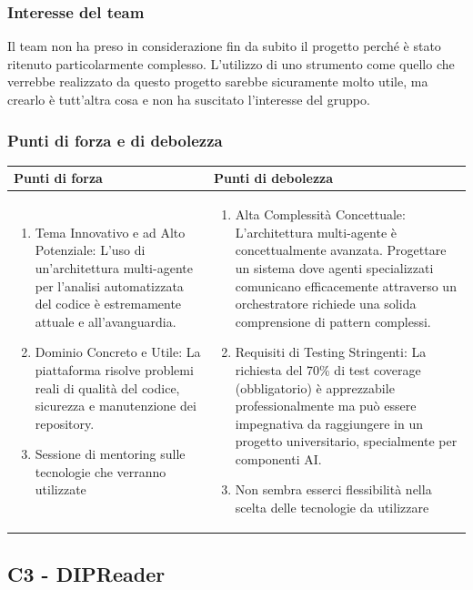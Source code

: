 \documentclass[a4paper,11pt]{article}
\begin{document}
\subsubsection{Interesse del team}
Il team non ha preso in considerazione fin da subito il progetto perché è stato ritenuto particolarmente complesso. L'utilizzo di uno strumento come quello che verrebbe realizzato da questo progetto sarebbe sicuramente molto utile, ma crearlo è tutt'altra cosa e non ha suscitato l'interesse del gruppo.
\subsubsection{Punti di forza e di debolezza}
{\footnotesize
\begin{tabularx}{\textwidth}{|X|X|}
\hline
\rowcolor{lightgray!40} %
\textbf{Punti di forza} & \textbf{Punti di debolezza} \\
\hline
\begin{enumerate}
\item Tema Innovativo e ad Alto Potenziale: L'uso di un'architettura multi-agente per l'analisi automatizzata del codice è estremamente attuale e all'avanguardia.
\item Dominio Concreto e Utile: La piattaforma risolve problemi reali di qualità del codice, sicurezza e manutenzione dei repository. 
\item Sessione di mentoring sulle tecnologie che verranno utilizzate
\end{enumerate}
 & \begin{enumerate}
\item Alta Complessità Concettuale: L'architettura multi-agente è concettualmente avanzata. Progettare un sistema dove agenti specializzati comunicano efficacemente attraverso un orchestratore richiede una solida comprensione di pattern complessi.
\item Requisiti di Testing Stringenti: La richiesta del 70\% di test coverage (obbligatorio) è apprezzabile professionalmente ma può essere impegnativa da raggiungere in un progetto universitario, specialmente per componenti AI.
\item Non sembra esserci flessibilità nella scelta delle tecnologie da utilizzare
\end{enumerate} \\
\hline
\end{tabularx}
}

\newpage
\subsection{C3 - DIPReader}
\end{document}

